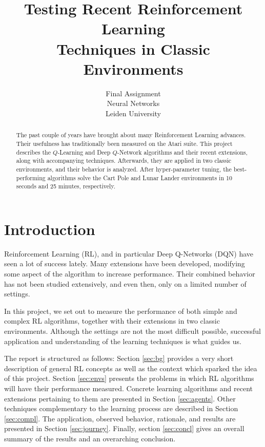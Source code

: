 \documentclass{article}
\title{Testing Recent Reinforcement Learning \\Techniques in Classic Environments}
\author{\fontfamily{ppl}\selectfont Final Assignment \\
\fontfamily{ppl}\selectfont Neural Networks \\
\fontfamily{ppl}\selectfont Leiden University \\
}
\begin{document}
\maketitle

\vspace{1cm}
\begin{abstract}

The past couple of years have brought about many Reinforcement Learning advances. Their usefulness has traditionally been measured on the Atari suite. This project describes the $Q$-Learning and Deep $Q$-Network algorithms and their recent extensions, along with accompanying techniques. Afterwards, they are applied in two classic environments, and their behavior is analyzed. After hyper-parameter tuning, the best-performing algorithms solve the Cart Pole and Lunar Lander environments in 10 seconds and 25 minutes, respectively.
\end{abstract}
\vspace{1.5cm}

\section{Introduction}
Reinforcement Learning (RL), and in particular Deep Q-Networks (DQN) have seen a lot of success lately. Many extensions have been developed, modifying some aspect of the algorithm to increase performance. Their combined behavior has not been studied extensively, and even then, only on a limited number of settings.

In this project, we set out to measure the performance of both simple and complex RL algorithms, together with their extensions in two classic environments. Although the settings are not the most difficult possible, successful application and understanding of the learning techniques is what guides us.

The report is structured as follows: Section \ref{sec:bg} provides a very short description of general RL concepts as well as the context which sparked the idea of this project. Section \ref{sec:envs} presents the problems in which RL algorithms will have their performance measured. Concrete learning algorithms and recent extensions pertaining to them are presented in Section \ref{sec:agents}. Other techniques complementary to the learning process are described in Section \ref{sec:compl}. The application, observed behavior, rationale, and results are presented in Section \ref{sec:journey}. Finally, section \ref{sec:concl} gives an overall summary of the results and an overarching conclusion.
\end{document}
